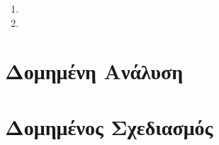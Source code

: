 \documentclass[12pt]{article}
\begin{document}
\begin{enumerate}
\item

\item
\end{enumerate}


\section*{Δομημένη Ανάλυση}

\section*{Δομημένος Σχεδιασμός}
\end{document}
